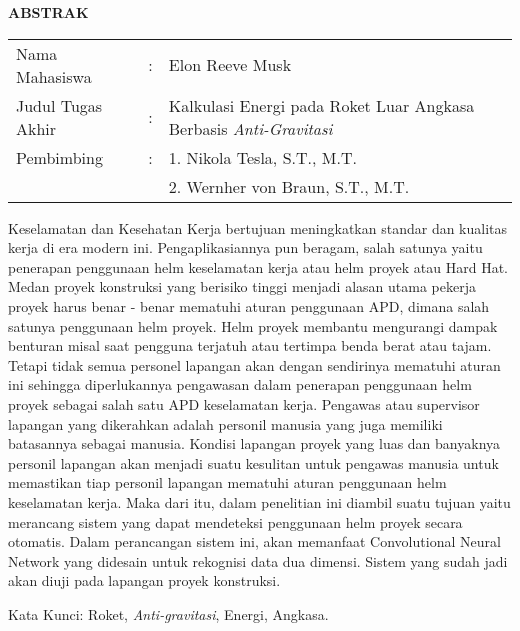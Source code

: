 \begin{center}
  \large\textbf{ABSTRAK}
\end{center}


\vspace{2ex}

\begingroup
  \setlength{\tabcolsep}{0pt}

  \noindent
  \begin{tabularx}{\textwidth}{l >{\centering}m{2em} X}
    Nama Mahasiswa    &:& Elon Reeve Musk \\

    Judul Tugas Akhir &:&	Kalkulasi Energi pada Roket Luar Angkasa Berbasis \emph{Anti-Gravitasi} \\

    Pembimbing        &:& 1. Nikola Tesla, S.T., M.T. \\
                      & & 2. Wernher von Braun, S.T., M.T. \\
  \end{tabularx}
\endgroup

Keselamatan dan Kesehatan Kerja bertujuan meningkatkan standar dan kualitas kerja di era modern ini. Pengaplikasiannya pun beragam, salah satunya yaitu penerapan penggunaan helm keselamatan kerja atau helm proyek atau Hard Hat. Medan proyek konstruksi yang berisiko tinggi menjadi alasan utama pekerja proyek harus benar - benar mematuhi aturan penggunaan APD, dimana salah satunya penggunaan helm proyek. Helm proyek membantu mengurangi dampak benturan misal saat pengguna terjatuh atau tertimpa benda berat atau tajam. Tetapi tidak semua personel lapangan akan dengan sendirinya mematuhi aturan ini sehingga diperlukannya pengawasan dalam penerapan penggunaan helm proyek sebagai salah satu APD keselamatan kerja. Pengawas atau supervisor lapangan yang dikerahkan adalah personil manusia yang juga memiliki batasannya sebagai manusia. Kondisi lapangan proyek yang luas dan banyaknya personil lapangan akan menjadi suatu kesulitan untuk pengawas manusia untuk memastikan tiap personil lapangan mematuhi aturan penggunaan helm keselamatan kerja. Maka dari itu, dalam penelitian ini diambil suatu tujuan yaitu merancang sistem yang dapat mendeteksi penggunaan helm proyek secara otomatis. Dalam perancangan sistem ini, akan memanfaat Convolutional Neural Network yang didesain untuk rekognisi data dua dimensi. Sistem yang sudah jadi akan diuji pada lapangan proyek konstruksi.


Kata Kunci: Roket, \emph{Anti-gravitasi}, Energi, Angkasa.
